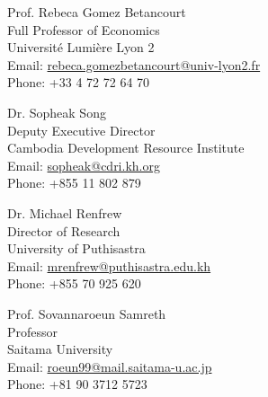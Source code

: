 \documentclass[10pt,a4paper]{article}
\begin{document}
\parbox{0.5\textwidth}{ %
	Prof. Rebeca Gomez Betancourt\\ 
	Full Professor of Economics\\ 
	Université Lumière Lyon 2\\
	Email: \href{mailto: Phone: rebeca.gomezbetancourt@univ-lyon2.fr}{rebeca.gomezbetancourt@univ-lyon2.fr}\\
	Phone: +33 4 72 72 64 70
}
\hfill %
\parbox{0.5\textwidth}{ %
	Dr. Sopheak Song\\ 
	Deputy Executive Director \\
	Cambodia Development Resource Institute\\ 
	Email: \href{mailto: sopheak@cdri.kh.org}{sopheak@cdri.kh.org}\\
	Phone: +855 11 802 879
}

\vspace{1.5em}

\parbox{0.5\textwidth}{ %
	Dr. Michael Renfrew\\ 
	Director of Research\\
	University of Puthisastra\\ 
	Email: \href{mailto: mrenfrew@puthisastra.edu.kh}{mrenfrew@puthisastra.edu.kh}\\
	Phone: +855 70 925 620
}
\hfill %
\parbox{0.5\textwidth}{ %
	Prof. Sovannaroeun Samreth \\ 
	Professor \\
	Saitama University \\
	Email: \href{mailto: roeun99@mail.saitama-u.ac.jp}{roeun99@mail.saitama-u.ac.jp}\\
	Phone: +81 90 3712 5723
}
\end{document}
